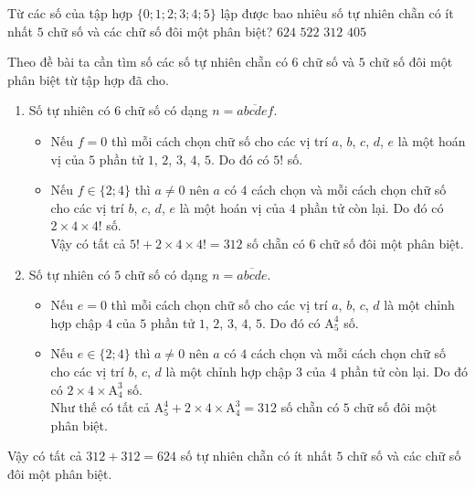 \begin{ex}%
	Từ các số của tập hợp $\{0;1;2;3;4;5\}$ lập được bao nhiêu số tự nhiên chẵn có ít nhất $5$ chữ số và các chữ số đôi một phân biệt?
	\choice
	{\True $624$}
	{$522$}
	{$312$}
	{$405$}
	\loigiai
	{Theo đề bài ta cần tìm số các số tự nhiên chẵn có $6$ chữ số và $5$ chữ số đôi một phân biệt từ tập hợp đã cho.
		\begin{enumerate}
			\item Số tự nhiên có $6$ chữ số có dạng $n=\overline{abcdef}$.
			      \begin{itemize}
				      \item Nếu $f=0$ thì mỗi cách chọn chữ số cho các vị trí $a$, $b$, $c$, $d$, $e$ là một hoán vị của $5$ phần tử $1$, $2$, $3$, $4$, $5$. Do đó có $5!$ số.
				      \item Nếu $f\in\{2;4\}$ thì $a\neq 0$ nên $a$ có $4$ cách chọn và  mỗi cách chọn chữ số cho các vị trí $b$, $c$, $d$, $e$ là một hoán vị của $4$ phần tử còn lại. Do đó có $2\times 4\times 4!$ số.\\
				            Vậy có tất cả $5!+2\times 4\times 4!=312$ số chẵn có $6$ chữ số đôi một phân biệt.
			      \end{itemize}
			\item Số tự nhiên có $5$ chữ số có dạng $n=\overline{abcde}$.
			      \begin{itemize}
				      \item Nếu $e=0$ thì mỗi cách chọn chữ số cho các vị trí $a$, $b$, $c$, $d$ là một chỉnh hợp chập $4$ của $5$ phần tử $1$, $2$, $3$, $4$, $5$. Do đó có $\mathrm{A}_5^4$ số.
				      \item Nếu $e\in\{2;4\}$ thì $a\neq 0$ nên $a$ có $4$ cách chọn và  mỗi cách chọn chữ số cho các vị trí $b$, $c$, $d$ là một chỉnh hợp chập $3$ của $4$ phần tử còn lại. Do đó có $2\times 4\times\mathrm{A}_4^3$ số.\\
				            Như thế có tất cả $\mathrm{A}_5^4+2\times 4\times\mathrm{A}_4^3=312$ số chẵn có $5$ chữ số đôi một phân biệt.
			      \end{itemize}
		\end{enumerate}
		Vậy có tất cả $312+312=624$ số tự nhiên chẵn có ít nhất $5$ chữ số và các chữ số đôi một phân biệt.
	}
\end{ex}
